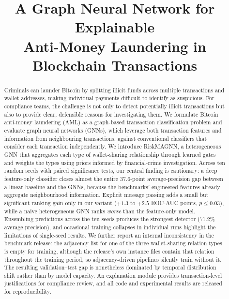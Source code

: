\documentclass[conference]{IEEEtran}
\begin{document}
\title{A Graph Neural Network for Explainable\\
Anti-Money Laundering in Blockchain Transactions}

\author{
}

\maketitle

\begin{abstract}
Criminals can launder Bitcoin by splitting illicit funds across multiple
transactions and wallet addresses, making individual payments difficult to
identify as suspicious. For compliance teams, the challenge is not only to
detect potentially illicit transactions but also to provide clear, defensible
reasons for investigating them. We formulate Bitcoin anti-money laundering
(AML) as a graph-based transaction classification problem and evaluate graph
neural networks (GNNs), which leverage both transaction features and
information from neighbouring transactions, against conventional classifiers
that consider each transaction independently. We introduce RiskMAGNN, a
heterogeneous GNN that aggregates each type of wallet-sharing relationship
through learned gates and weights the types using priors informed by
financial-crime investigation. Across ten random seeds
with paired significance tests, our central finding is cautionary: a deep
feature-only classifier closes almost the entire 37.6-point average-precision
gap between a linear baseline and the GNNs, because the benchmarks'
engineered features already aggregate neighbourhood information. Explicit
message passing adds a small but significant ranking gain only in our
variant ($+1.3$ to $+2.5$ ROC-AUC points, $p\le0.03$), while a naive
heterogeneous GNN ranks \emph{worse} than the feature-only model.
Ensembling predictions across the ten seeds produces the strongest detector
(71.2\% average precision), and occasional training collapses in individual
runs highlight the limitations of single-seed results. We further report an
internal inconsistency in the benchmark release: the adjacency list for one
of the three wallet-sharing relation types is empty for training, although
the release's own instance files contain that relation throughout the
training period, so adjacency-driven pipelines silently train without it. The
resulting validation--test gap is nonetheless dominated by temporal
distribution shift rather than by model capacity. An explanation module provides
transaction-level justifications for compliance review, and all code and
experimental results are released for reproducibility.
\end{abstract}
\end{document}
